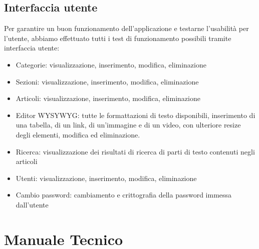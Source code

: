\documentclass[twoside]{supsistudent}
\begin{document}
\section{Interfaccia utente}
Per garantire un buon funzionamento dell'applicazione e testarne l'usabilità per l'utente, abbiamo effettuato tutti i test di funzionamento possibili tramite interfaccia utente:
\begin{itemize}
\item Categorie: visualizzazione, inserimento, modifica, eliminazione
\item Sezioni: visualizzazione, inserimento, modifica, eliminazione
\item Articoli: visualizzazione, inserimento, modifica, eliminazione
\item Editor WYSYWYG: tutte le formattazioni di testo disponibili, inserimento di una tabella, di un link, di un'immagine e di un video, con ulteriore resize degli elementi, modifica ed eliminazione.
\item Ricerca: visualizzazione dei risultati di ricerca di parti di testo contenuti negli articoli
\item Utenti: visualizzazione, inserimento, modifica, eliminazione
\item Cambio password: cambiamento e crittografia della password immessa dall'utente
\end{itemize}





\chapter{Manuale Tecnico}
\end{document}
